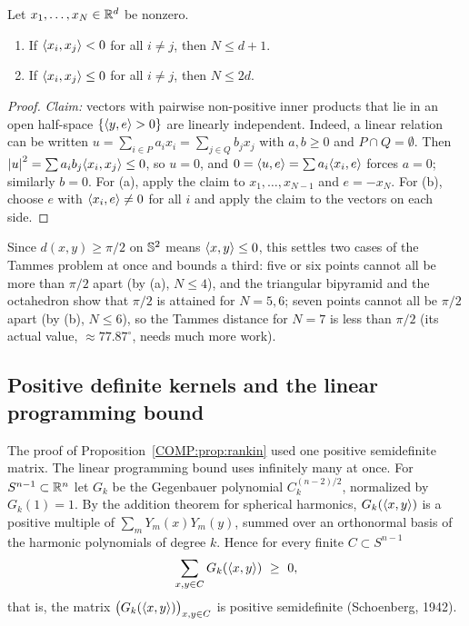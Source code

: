 \begin{proposition}[Rankin 1955]\label{COMP:prop:rankin}
Let $x_1,\dots,x_N\in\mathbb{R}^d$ be nonzero.
\begin{enumerate}[label=(\alph*),nosep]
\item If $\langle x_i, x_j\rangle<0$ for all $i\ne j$, then $N\le d+1$.
\item If $\langle x_i, x_j\rangle\le0$ for all $i\ne j$, then $N\le2d$.
\end{enumerate}
\end{proposition}

\begin{proof}
\emph{Claim:} vectors with pairwise non-positive inner products that lie in an open half-space
$\{\langle y, e\rangle>0\}$ are linearly independent. Indeed, a linear relation can be written
$u=\sum_{i\in P}a_ix_i=\sum_{j\in Q}b_jx_j$ with $a,b\ge0$ and $P\cap Q=\emptyset$. Then
$\left\lvert u \right\rvert^2=\sum a_ib_j\langle x_i, x_j\rangle\le0$, so $u=0$, and $0=\langle u, e\rangle=\sum a_i\langle x_i, e\rangle$ forces $a=0$; similarly
$b=0$. For (a), apply the claim to $x_1,\dots,x_{N-1}$ and $e=-x_N$. For (b), choose $e$ with
$\langle x_i, e\rangle\ne0$ for all $i$ and apply the claim to the vectors on each side.
\end{proof}

Since $d(x,y)\ge\pi/2$ on $\mathbb{S}^2$ means $\langle x, y\rangle\le0$, this settles two cases of the Tammes problem at
once and bounds a third: five or six points cannot all be more than $\pi/2$ apart (by (a), $N\le4$), and
the triangular bipyramid and the octahedron show that $\pi/2$ is attained for $N=5,6$; seven points cannot
all be $\pi/2$ apart (by (b), $N\le6$), so the Tammes distance for $N=7$ is less than $\pi/2$ (its actual
value, $\approx77.87^\circ$, needs much more work).

\subsection{Positive definite kernels and the linear programming bound}
The proof of Proposition~\ref{COMP:prop:rankin} used one positive semidefinite matrix. The linear
programming bound uses infinitely many at once. For $S^{n-1}\subset\mathbb{R}^n$ let $G_k$ be the Gegenbauer
polynomial $C_k^{(n-2)/2}$, normalized by $G_k(1)=1$. By the addition theorem for spherical harmonics,
$G_k(\langle x, y\rangle)$ is a positive multiple of $\sum_mY_m(x)Y_m(y)$, summed over an orthonormal basis of the
harmonic polynomials of degree $k$. Hence for every finite $C\subset S^{n-1}$
\begin{equation}\label{COMP:eq:posdef}
  \sum_{x,y\in C}G_k(\langle x, y\rangle)\ \ge\ 0,
\end{equation}
that is, the matrix $\big(G_k(\langle x, y\rangle)\big)_{x,y\in C}$ is positive semidefinite (Schoenberg, 1942).

